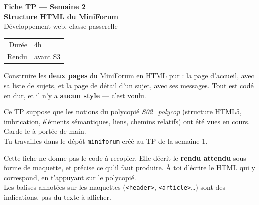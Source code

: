 \documentclass[a4paper,11pt]{article}
\begin{document}

\begin{tcolorbox}[
  colback=accentBlue, colframe=accentBlue,
  arc=4pt, left=12pt, right=12pt, top=10pt, bottom=10pt]
  \begin{minipage}{0.72\linewidth}
    {\color{cfptYellow}\Large\bfseries Fiche TP --- Semaine 2}\\[4pt]
    {\color{white}\Large\bfseries Structure HTML du MiniForum}\\[4pt]
    {\color{lightBlue}\normalsize Développement web, classe passerelle}
  \end{minipage}
  \hfill
  \begin{minipage}{0.24\linewidth}
    \raggedleft
    \begin{tabular}{rl}
      \color{lightBlue}\small Durée & \color{white}\small 4h \\
      \color{lightBlue}\small Rendu & \color{white}\small avant S3 \\
    \end{tabular}
  \end{minipage}
\end{tcolorbox}

\vspace{6pt}
\begin{tcolorbox}[definition, title={Objectif du TP}]
Construire les \textbf{deux pages} du MiniForum en HTML pur : la page d'accueil, avec sa liste de sujets, et la page de détail d'un sujet, avec ses messages. Tout est codé en dur, et il n'y a \textbf{aucun style} --- c'est voulu.
\end{tcolorbox}

\begin{tcolorbox}[astuce, title={Avant de commencer}]
Ce TP suppose que les notions du polycopié \textit{S02\_polycop} (structure HTML5, imbrication, éléments sémantiques, liens, chemins relatifs) ont été vues en cours. Garde-le à portée de main.\\[3pt]
Tu travailles dans le dépôt \texttt{miniforum} créé au TP de la semaine 1.
\end{tcolorbox}

\vspace{4pt}
\begin{tcolorbox}[attention, title={Comment lire cette fiche}]
Cette fiche ne donne pas le code à recopier. Elle décrit le \textbf{rendu attendu} sous forme de maquette, et précise ce qu'il faut produire. À toi d'écrire le HTML qui y correspond, en t'appuyant sur le polycopié.\\[4pt]
Les balises annotées sur les maquettes (\texttt{<header>}, \texttt{<article>}\dots) sont des indications, pas du texte à afficher.
\end{tcolorbox}
\end{document}
